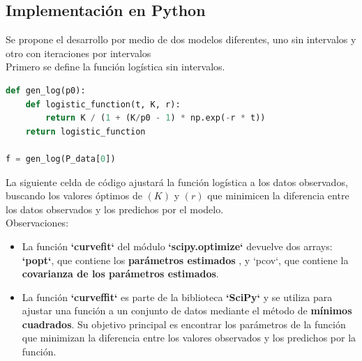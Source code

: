 \documentclass[a4paper,10pt,twocolumn]{article}
\begin{document}
	\subsection{Implementación en Python}\label{sub:python}
Se propone el desarrollo por medio de dos modelos diferentes, uno sin intervalos y otro con iteraciones por intervalos\\
Primero se define la función logística sin intervalos.
\begin{lstlisting}[language=Python, caption=Código función logística sin intervalos]
def gen_log(p0):
	def logistic_function(t, K, r):
		return K / (1 + (K/p0 - 1) * np.exp(-r * t))
	return logistic_function
				
f = gen_log(P_data[0])
\end{lstlisting}

La siguiente celda de código ajustará la función logística a los datos observados, buscando los valores óptimos de $(K)$ y $(r)$ que minimicen la diferencia entre los datos observados y los predichos por el modelo.\\ 
Observaciones:
\begin{itemize}
	\item La función \textbf{`curvefit`} del módulo \textbf{`scipy.optimize`} devuelve dos arrays: \textbf{`popt`}, que contiene los \textbf{parámetros estimados} , y `pcov`, que contiene la \textbf{covarianza de los parámetros estimados}.
	\item La función \textbf{`curveffit`} es parte de la biblioteca \textbf{`SciPy`} y se utiliza para ajustar una función a un conjunto de datos mediante el método de \textbf{mínimos cuadrados}. Su objetivo principal es encontrar los parámetros de la función que minimizan la diferencia entre los valores observados y los predichos por la función.
\end{itemize}
\end{document}
